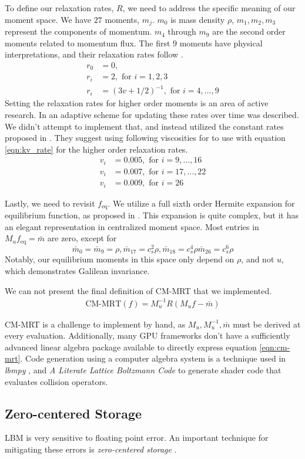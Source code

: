 To define our relaxation rates, $R$, we need to address
the specific meaning of our moment space.
We have $27$ moments, $m_j$.
$m_0$ is mass density $\rho$, 
$m_1, m_2, m_3$ represent the components of momentum.
$m_4$ through $m_9$ are the second order moments related
to momentum flux.
The first $9$ moments have physical interpretations,
and their relaxation rates follow \cite{Li2020, De2017}.
\begin{align}
  r_0 &= 0, \nonumber \\
  r_i &= 2, \text{ for } i = 1,2,3 \nonumber \\
  r_i &= (3v + 1 / 2)^{-1}, \text{ for } i = 4,\ldots, 9 \label{eqn:kv_rate}
\end{align}
Setting the relaxation rates for higher order moments 
is an area of active research.
In \cite{Li2020} an adaptive scheme for updating these rates
over time was described.
We didn't attempt to implement that, 
and instead utilized the constant rates proposed in \cite{Li2018}.
They suggest using following viscosities for
to use with equation \ref{eqn:kv_rate}
for the higher order relaxation rates. 
\begin{align*}
  v_i &= 0.005, \text{ for } i = 9,\ldots, 16 \\
  v_i &= 0.007, \text{ for } i = 17, \ldots, 22 \\
  v_i &= 0.009, \text{ for } i = 26 
\end{align*}

Lastly, we need to revisit $f_{\text{eq}}$.
We utilize a full sixth order Hermite expansion for 
equilibrium function, as proposed in \cite{Shan2006}.
This expansion is quite complex, but it has an elegant
representation in centralized moment space.
Most entries in $M_u f_{\text{eq}} = \bar{m}$ are zero, 
except for
$$
\bar{m}_0 = \bar{m}_9 = \rho, \bar{m}_{17} = c_s^2 \rho, \bar{m}_{18} = c_s^4\rho \bar{m}_{26} = c_s^6 \rho
$$
Notably, our equilibrium moments in this space only depend on $\rho$,
and not $u$, which demonstrates Galilean invariance.

We can not present the final definition of CM-MRT that we implemented.
\begin{align}
  \text{CM-MRT}(f) = M_u^{-1} R (M_u f - \bar{m}) \label{eqn:cm-mrt}
\end{align}

CM-MRT is a challenge to implement by hand, 
as $M_u, M_u^{-1}, \bar{m}$ must be derived at every evaluation.
Additionally, many GPU frameworks
don't have a sufficiently advanced linear algebra package available
to directly express equation \ref{eqn:cm-mrt}.
Code generation using a computer algebra system is a technique used 
in \textit{lbmpy} \cite{Hennig2023}, 
and \textit{A Literate Lattice Boltzmann Code} \cite{web:literate_lbm} 
to generate shader code that
evaluates collision operators.

\subsection{Zero-centered Storage}
LBM is very sensitive to floating point error.
An important technique for mitigating these errors is 
\textit{zero-centered storage} \cite{Lehmann2022, Hennig2023}.

